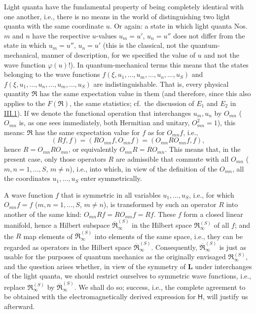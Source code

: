 \documentclass[fontsize=13pt,twoside,openany,headings=normal,parskip=false,bookmarkpackage=false,DIV=calc]{scrbook}
\begin{document}
Light quanta have the fundamental property of being completely identical with one another, i.e., there is no means in the world of distinguishing two light quanta with the same coordinate $u$. Or again: a state in which light quanta Nos.~$m$ and $n$ have the respective $u$-values $u_m=u'$, $u_n=u''$ does not differ from the state in which $u_m=u''$, $u_n=u'$ (this is the classical, not the quantum-mechanical, manner of description, for we specified the value of $u$ and not the wave function $\varphi(u)$!). In quantum-mechanical terms this means that the states belonging to the wave functions $f(\xi,u_1,\ldots,u_m,\ldots,u_n,\ldots,u_S)$ and $f(\xi,u_1,\ldots,u_n,\ldots,u_m,\ldots,u_S)$ are indistinguishable. That is, every physical quantity $\mathfrak R$ has the same expectation value in them (and therefore, since this also applies to the $F(\mathfrak R)$, the same statistics; cf.\ the discussion of \hyperref[post:III.1.E1]{$E_1$} and \hyperref[post:III.1.E2]{$E_2$} in \hyperref[sec:III.1]{III.1}). If we denote the functional operation that interchanges $u_m,u_n$ by $O_{mn}$ ($O_{mn}$ is, as one sees immediately, both Hermitian and unitary, $O_{mn}^2=1$), this means: $\mathfrak R$ has the same expectation value for $f$ as for $O_{mn}f$, i.e.,
\[
 (Rf,f)=(RO_{mn}f,O_{mn}f)=(O_{mn}RO_{mn}f,f),
\]
hence $R=O_{mn}RO_{mn}$, or equivalently $O_{mn}R=RO_{mn}$.
This means that, in the present case, only those operators $R$ are admissible that commute with all $O_{mn}$ ($m,n=1,\ldots,S$, $m\ne n$), i.e., into which, in view of the definition of the $O_{mn}$, all the coordinates $u_1,\ldots,u_S$ enter symmetrically.

A wave function $f$ that is symmetric in all variables $u_1,\ldots,u_S$, i.e., for which $O_{mn}f=f$ ($m,n=1,\ldots,S$, $m\ne n$), is transformed by such an operator $R$ into another of the same kind: $O_{mn}Rf=RO_{mn}f=Rf$. These $f$ form a closed linear manifold, hence a Hilbert subspace $\overline{\mathfrak R}_{\infty}^{(S)}$ in the Hilbert \hypertarget{origpage-147}{}space $\mathfrak R_{\infty}^{(S)}$ of all $f$; and the $R$ map elements of $\overline{\mathfrak R}_{\infty}^{(S)}$ into elements of the same space, i.e., they can be regarded as operators in the Hilbert space $\overline{\mathfrak R}_{\infty}^{(S)}$. Consequently, $\overline{\mathfrak R}_{\infty}^{(S)}$ is just as usable for the purposes of quantum mechanics as the originally envisaged $\mathfrak R_{\infty}^{(S)}$, and the question arises whether, in view of the symmetry of $\boldsymbol{L}$ under interchanges of the light quanta, we should restrict ourselves to symmetric wave functions, i.e., replace $\mathfrak R_{\infty}^{(S)}$ by $\overline{\mathfrak R}_{\infty}^{(S)}$. We shall do so; success, i.e., the complete agreement to be obtained with the electromagnetically derived expression for $\mathsf{H}$, will justify us afterward.
\end{document}
